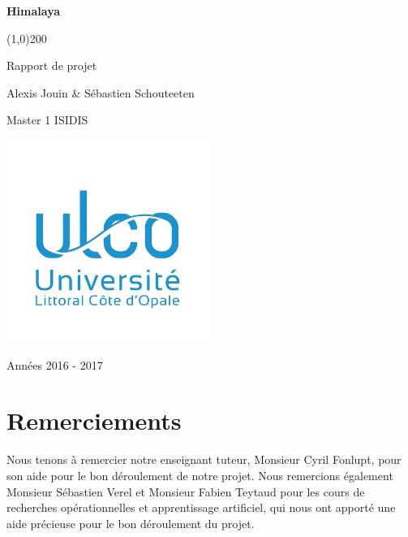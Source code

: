 \documentclass[french]{scrartcl}
\begin{document}
	
	\begin{titlepage}
		\begin{center}
			\vspace*{2cm}
			
			\Huge
			\textbf{Himalaya}
			
			\line(1,0){200}
			
			\vspace{0.5cm}
			\LARGE
			Rapport de projet
			
			\vspace{4.5cm}
			
			\large
			Alexis Jouin \& Sébastien Schouteeten
			
			\vspace{0.5cm}
			Master 1 ISIDIS
			
			\vfill
			
			\includegraphics[width=0.5\textwidth]{images/ulco}
			
			\vspace{0.8cm}
			
			\Large
			Années 2016 - 2017
			
		\end{center}
	\end{titlepage}
	
	\newpage
	
	\tableofcontents
	
	\newpage
	
	\section{Remerciements}
	Nous tenons à remercier notre enseignant tuteur, Monsieur Cyril Fonlupt, pour son aide pour le bon déroulement de notre projet. Nous remercions également Monsieur Sébastien Verel et Monsieur Fabien Teytaud pour les cours de recherches opérationnelles et apprentissage artificiel, qui nous ont apporté une aide précieuse pour le bon déroulement du projet.
	
	\newpage
	
	
	
	\newpage
	
	
	
	\newpage
	
	
	
	
	
	
	\newpage
	
	
	\newpage
	
	
	\newpage
	
	
\end{document}
